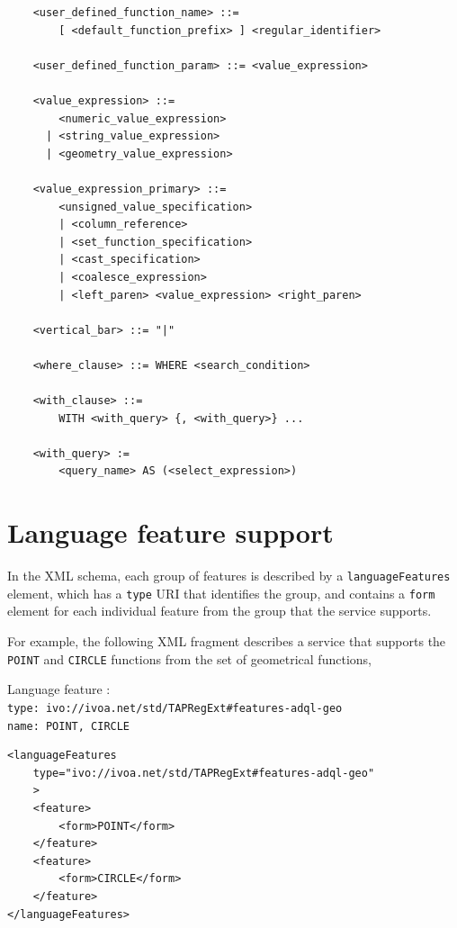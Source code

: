 \documentclass[11pt,a4paper]{ivoa}
\begin{document}
\begin{verbatim}
    <user_defined_function_name> ::=
        [ <default_function_prefix> ] <regular_identifier>

    <user_defined_function_param> ::= <value_expression>

    <value_expression> ::=
        <numeric_value_expression>
      | <string_value_expression>
      | <geometry_value_expression>

    <value_expression_primary> ::=
        <unsigned_value_specification>
        | <column_reference>
        | <set_function_specification>
        | <cast_specification>
        | <coalesce_expression>
        | <left_paren> <value_expression> <right_paren>

    <vertical_bar> ::= "|"

    <where_clause> ::= WHERE <search_condition>

    <with_clause> ::=
        WITH <with_query> {, <with_query>} ...

    <with_query> :=
        <query_name> AS (<select_expression>)

\end{verbatim}

\clearpage %
\section{Language feature support}
\label{sec:features}

In the \TAPRegSpec{} XML schema, each group of features is
described by a \verb:languageFeatures: element, which has a \verb:type:
URI that identifies the group, and contains a \verb:form: element for each
individual feature from the group that the service supports.

For example, the following XML fragment describes a service that supports the
\verb:POINT: and \verb:CIRCLE: functions from the set of geometrical functions,

{\footnotesize Language feature :}\\
{\footnotesize \verb|type: ivo://ivoa.net/std/TAPRegExt#features-adql-geo|}\\
{\footnotesize \verb|name: POINT, CIRCLE|}\\

\begin{verbatim}
<languageFeatures
    type="ivo://ivoa.net/std/TAPRegExt#features-adql-geo"
    >
    <feature>
        <form>POINT</form>
    </feature>
    <feature>
        <form>CIRCLE</form>
    </feature>
</languageFeatures>    
\end{verbatim}
\end{document}
